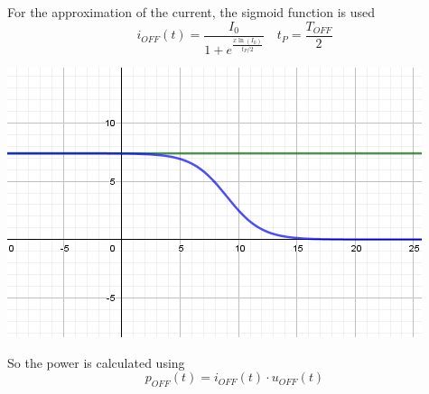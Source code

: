 \documentclass{article}
\begin{document}
    For the approximation of the current, the sigmoid function is used
    \begin{equation}
        i_{OFF}(t) = \frac{I_0}{1 + e^{\frac{x \ln(I_0)}{t_P/2}}}\quad t_P = \frac{T_{OFF}}{2}
    \end{equation}
    \begin{center}
        \includegraphics[scale=0.5]{images/CurrentApprox.PNG}
    \end{center}
    
    So the power is calculated using
    \begin{equation}
        p_{OFF}(t) = i_{OFF}(t) \cdot u_{OFF}(t)
    \end{equation}
    
\end{document}
